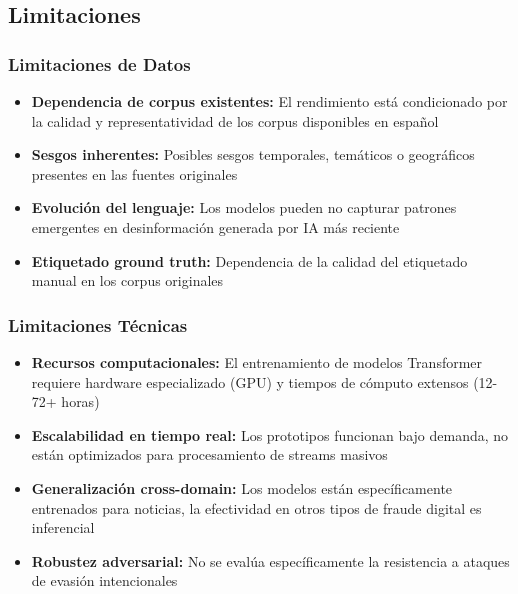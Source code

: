 \subsection{Limitaciones}

\subsubsection{Limitaciones de Datos}
\begin{itemize}
    \item \textbf{Dependencia de corpus existentes:} El rendimiento está condicionado por la calidad y representatividad de los corpus disponibles en español
    \item \textbf{Sesgos inherentes:} Posibles sesgos temporales, temáticos o geográficos presentes en las fuentes originales
    \item \textbf{Evolución del lenguaje:} Los modelos pueden no capturar patrones emergentes en desinformación generada por IA más reciente
    \item \textbf{Etiquetado ground truth:} Dependencia de la calidad del etiquetado manual en los corpus originales
\end{itemize}

\subsubsection{Limitaciones Técnicas}
\begin{itemize}
    \item \textbf{Recursos computacionales:} El entrenamiento de modelos Transformer requiere hardware especializado (GPU) y tiempos de cómputo extensos (12-72+ horas)
    \item \textbf{Escalabilidad en tiempo real:} Los prototipos funcionan bajo demanda, no están optimizados para procesamiento de streams masivos
    \item \textbf{Generalización cross-domain:} Los modelos están específicamente entrenados para noticias, la efectividad en otros tipos de fraude digital es inferencial
    \item \textbf{Robustez adversarial:} No se evalúa específicamente la resistencia a ataques de evasión intencionales
\end{itemize}


